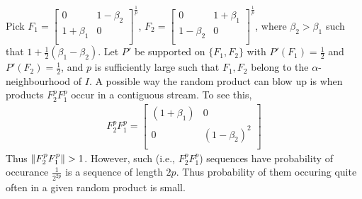 \begin{example}
Pick $F_1=\begin{bmatrix} 0 & 1-\beta_2 \\ 1+\beta_1& 0\\\end{bmatrix}^{\frac{1}{p}}$, $F_2=\begin{bmatrix} 0 & 1+\beta_1 \\ 1-\beta_2& 0\\\end{bmatrix}^{\frac{1}{p}}$, where $\beta_2>\beta_1$ such that $1+\frac{1}{2}(\beta_1-\beta_2)$. Let $P'$ be supported on $\{F_1,F_2\}$ with $P'(F_1)=\frac{1}{2}$ and $P'(F_2)=\frac{1}{2}$, and  $p$ is sufficiently large such that $F_1,F_2$ belong to the $\alpha$-neighbourhood of $I$. A possible way the random product can blow up is when products $F_2^pF_1^p$ occur in a contiguous stream. To see this,
\begin{align}
F_2^pF_1^p=\begin{bmatrix} (1+\beta_1) &0  \\ 0& (1-\beta_2)^2\\\end{bmatrix}
\end{align}
Thus $\norm{F_2^p F_1^p}>1$. However, such (i.e., $F_2^p F_1^p$) sequences have probability of occurance $\frac{1}{2^{2p}}$ is a sequence of length $2p$. Thus probability of them occuring quite often in a given random product is small.
\end{example}
